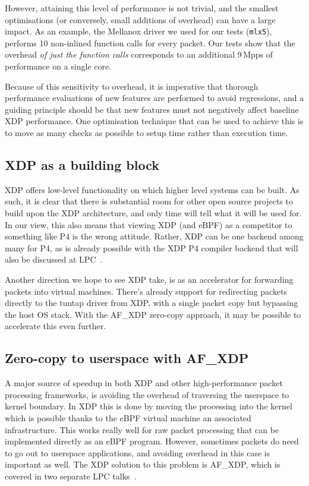 \documentclass[sigconf]{acmart}
\begin{document}
However, attaining this level of performance is not trivial, and the smallest
optimisations (or conversely, small additions of overhead) can have a large
impact. As an example, the Mellanox driver we used for our tests
(\texttt{mlx5}), performs 10 non-inlined function calls for every packet. Our
tests show that the overhead \emph{of just the function calls} corresponds to an
additional 9\,Mpps of performance on a single core.

Because of this sensitivity to overhead, it is imperative that thorough
performance evaluations of new features are performed to avoid regressions, and
a guiding principle should be that new features must not negatively affect
baseline XDP performance. One optimisation technique that can be used to achieve
this is to move as many checks as possible to setup time rather than execution
time.

\subsection{XDP as a building block}
\label{sec:xdp-as-building}

XDP offers low-level functionality on which higher level systems can be built.
As such, it is clear that there is substantial room for other open source
projects to build upon the XDP architecture, and only time will tell what it
will be used for. In our view, this also means that viewing XDP (and eBPF) as a
competitor to something like P4 is the wrong attitude. Rather, XDP can be one
backend among many for P4, as is already possible with the XDP P4 compiler
backend that will also be discussed at LPC~\cite{xdp-p4}.

Another direction we hope to see XDP take, is as an accelerator for forwarding
packets into virtual machines. There's already support for redirecting packets
directly to the tuntap driver from XDP, with a single packet copy but bypassing
the host OS stack. With the AF\_XDP zero-copy approach, it may be possible to
accelerate this even further.

\subsection{Zero-copy to userspace with AF\_XDP}
\label{sec:zero-copy-userspace}

A major source of speedup in both XDP and other high-performance packet
processing frameworks, is avoiding the overhead of traversing the userspace to
kernel boundary. In XDP this is done by moving the processing into the kernel
which is possible thanks to the eBPF virtual machine an associated
infrastructure. This works really well for raw packet processing that can be
implemented directly as an eBPF program. However, sometimes packets do need to
go out to userspace applications, and avoiding overhead in this case is
important as well. The XDP solution to this problem is AF\_XDP, which is covered
in two separate LPC talks~\cite{af-xdp,xdp-ovs}.
\end{document}

